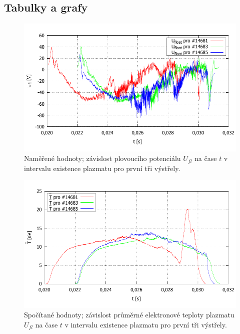 \documentclass[english]{article}
\begin{document}
\clearpage
\subsection{Tabulky a grafy}
%
	\begin{figure}[h!]
	\begin{center}
	    \vspace*{-1cm}
		\includegraphics[width=\linewidth]{../gnuplot/135_merge_2.pdf}
	    \vspace*{-1,5cm}
		\caption{Naměřené hodnoty; závislost plovoucího potenciálu $U_{fl}$ na čase $t$ v intervalu existence plazmatu pro první tři výstřely.} 
		\label{fig:g_3Ufl}
	\end{center}
	\end{figure}	
%
	\begin{figure}[h!]
	\begin{center}
	    \vspace*{-1cm}
		\includegraphics[width=\linewidth]{../gnuplot/135_merge_T.pdf}
	    \vspace*{-1,5cm}
		\caption{Spočítané hodnoty; závislost průměrné elektronové teploty plazmatu $U_{fl}$ na čase $t$ v intervalu existence plazmatu pro první tři výstřely.} 
		\label{fig:g_3Te}
	\end{center}
	\end{figure}	
\end{document}
